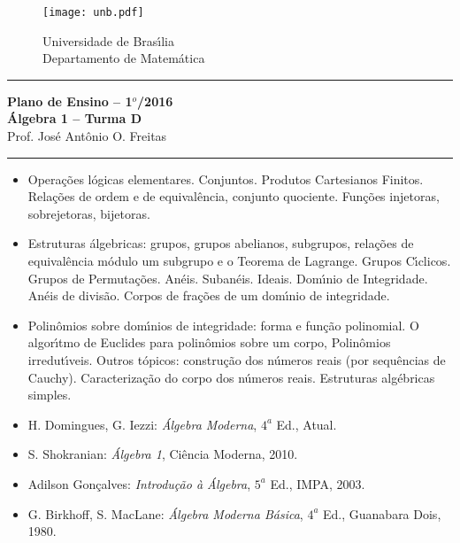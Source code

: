 \documentclass[12pt]{article}
\begin{document}
\pagestyle{empty}

\begin{figure}[h]
    \begin{minipage}[c]{1.7cm}
    \texttt{[image: unb.pdf]}
    \end{minipage}%
    \hspace{0pt}
    \begin{minipage}[c]{4in}
    {Universidade de Bras{\'\i}lia} \\
    {Departamento de Matem{\'a}tica}
    \end{minipage}
\end{figure}
\vspace{-0.9cm}
\hrule

\begin{center}
{\large\bf Plano de Ensino -- 1$^{o}$/2016} \\
{\large\bf \'Algebra 1 -- Turma D}\\
Prof. Jos{\'e} Ant{\^o}nio O. Freitas
\end{center}
\hrule
\vspace{0.25cm}
\begin{itemize}

\item Opera\c{c}\~oes l\'ogicas elementares. Conjuntos. Produtos Cartesianos Finitos. Rela\c{c}\~oes de ordem e de equival\^encia, conjunto quociente. Fun\c{c}\~oes injetoras, sobrejetoras, bijetoras.

\item Estruturas \'algebricas: grupos, grupos abelianos, subgrupos, rela\c{c}\~oes de equival\^encia m\'odulo um subgrupo e o Teorema de Lagrange. Grupos C{\'\i}clicos. Grupos de Permuta\c{c}\~oes. An\'eis. Suban\'eis. Ideais. Dom{\'\i}nio de Integridade. An\'eis de divis\~ao. Corpos de fra\c{c}\~oes de um dom{\'\i}nio de integridade.

\item Polin\^omios sobre dom{\'\i}nios de integridade: forma e fun\c{c}\~ao polinomial. O algor{\'\i}tmo de Euclides para polin\^omios sobre um corpo, Polin\^omios irredut{\'\i}veis. Outros t\'opicos: constru\c{c}\~ao dos n\'umeros reais (por sequ\^encias de Cauchy). Caracteriza\c{c}\~ao do corpo dos n\'umeros reais. Estruturas alg\'ebricas simples.
\end{itemize}

\vspace{0.5cm}
\begin{itemize}

\item H. Domingues, G. Iezzi: {\it {\'A}lgebra Moderna}, $4^a$
  Ed., Atual.

\item S. Shokranian: {\it {\'A}lgebra 1}, Ci{\^e}ncia Moderna, 2010.

\item Adilson Gon{\c c}alves: {\it Introdu{\c c}{\~a}o {\`a} {\'A}lgebra}, $5^a$ Ed., IMPA,
  2003.

\item G. Birkhoff, S. MacLane: {\it {\'A}lgebra Moderna B{\'a}sica}, $4^a$ Ed.,
  Guanabara Dois, 1980.

\end{itemize}
\end{document}
